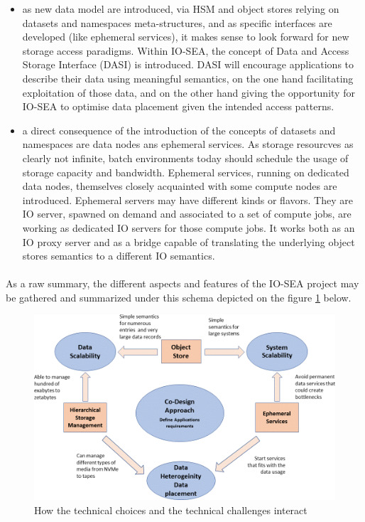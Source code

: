 \begin{itemize}
    \item as new data model are introduced, via HSM and object stores relying on datasets and namespaces 
    meta-structures, and as specific interfaces are developed (like ephemeral services), it makes sense to 
    look forward for new storage access paradigms. Within IO-SEA, the concept of Data and Access Storage 
    Interface (DASI) is introduced.  DASI will encourage applications to describe their data using meaningful semantics, on the one hand facilitating exploitation of those data, and on the other hand giving the opportunity for IO-SEA to optimise data placement given the intended access patterns.
    
    \item a direct consequence of the introduction of the concepts of datasets and namespaces are data nodes ans
    ephemeral services. As storage resourcves as clearly not infinite, batch environments today should schedule the usage of storage capacity and bandwidth. Ephemeral services, running on dedicated data nodes, themselves 
    closely acquainted with some compute nodes are introduced. Ephemeral servers may have different kinds or 
    flavors. They are IO server, spawned on demand and associated to a set of compute jobs, are working as
    dedicated IO servers for those compute jobs. It works both as an IO proxy server and as a bridge capable of
    translating the underlying object stores semantics to a different IO semantics. 
\end{itemize}

\paragraph{}
As a raw summary, the different aspects and features of the IO-SEA project may be gathered and
summarized under this schema depicted on the figure \ref{fig:iosea-nutshell} below. 
\begin{figure}[ht]
    \centering
    \includegraphics[width=\textwidth]{FIGS/IOsea.png}
    \caption[IO-SEA in a nutshell]{ How the technical choices and the technical challenges interact}
    \label{fig:iosea-nutshell}
\end{figure}


